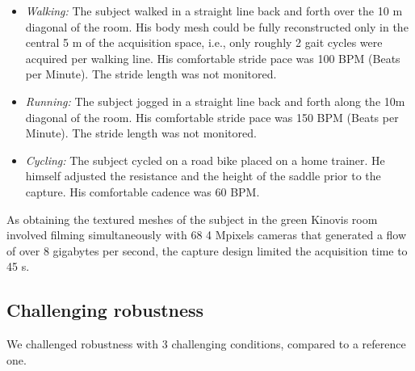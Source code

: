 \begin{itemize}[itemsep=0em, topsep=0em, leftmargin=*]
      \item \textit{Walking:} The subject walked in a straight line back and forth over the 10 m diagonal of the room. His body mesh could be fully reconstructed only in the central 5 m of the acquisition space, i.e., only roughly 2 gait cycles were acquired per walking line. His comfortable stride pace was 100 BPM (Beats per Minute). The stride length was not monitored. 
      \item \textit{Running:} The subject jogged in a straight line back and forth along the 10m diagonal of the room. His comfortable stride pace was 150 BPM (Beats per Minute). The stride length was not monitored.
      \item \textit{Cycling:} The subject cycled on a road bike placed on a home trainer. He himself adjusted the resistance and the height of the saddle prior to the capture. His comfortable cadence was 60 BPM.
\end{itemize}
As obtaining the textured meshes of the subject in the green Kinovis room involved filming simultaneously with 68 4 Mpixels cameras that generated a flow of over 8 gigabytes per second, the capture design limited the acquisition time to 45 s.


\subsection{Challenging robustness}

We challenged robustness with 3 challenging conditions, compared to a reference one.

